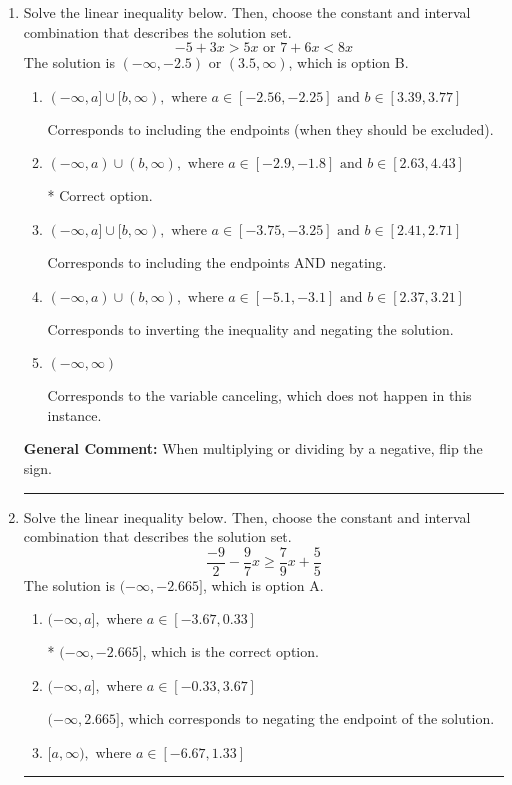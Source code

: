 \documentclass{extbook}[14pt]
\newcommand{\litem}[1]{\item #1

\rule{\textwidth}{0.4pt}}
\begin{document}
\begin{enumerate}\litem{
Solve the linear inequality below. Then, choose the constant and interval combination that describes the solution set.
\[ -5 + 3 x > 5 x \text{ or } 7 + 6 x < 8 x \]The solution is \( (-\infty, -2.5) \text{ or } (3.5, \infty) \), which is option B.\begin{enumerate}[label=\Alph*.]
\item \( (-\infty, a] \cup [b, \infty), \text{ where } a \in [-2.56, -2.25] \text{ and } b \in [3.39, 3.77] \)

Corresponds to including the endpoints (when they should be excluded).
\item \( (-\infty, a) \cup (b, \infty), \text{ where } a \in [-2.9, -1.8] \text{ and } b \in [2.63, 4.43] \)

 * Correct option.
\item \( (-\infty, a] \cup [b, \infty), \text{ where } a \in [-3.75, -3.25] \text{ and } b \in [2.41, 2.71] \)

Corresponds to including the endpoints AND negating.
\item \( (-\infty, a) \cup (b, \infty), \text{ where } a \in [-5.1, -3.1] \text{ and } b \in [2.37, 3.21] \)

Corresponds to inverting the inequality and negating the solution.
\item \( (-\infty, \infty) \)

Corresponds to the variable canceling, which does not happen in this instance.
\end{enumerate}

\textbf{General Comment:} When multiplying or dividing by a negative, flip the sign.
}
\litem{
Solve the linear inequality below. Then, choose the constant and interval combination that describes the solution set.
\[ \frac{-9}{2} - \frac{9}{7} x \geq \frac{7}{9} x + \frac{5}{5} \]The solution is \( (-\infty, -2.665] \), which is option A.\begin{enumerate}[label=\Alph*.]
\item \( (-\infty, a], \text{ where } a \in [-3.67, 0.33] \)

* $(-\infty, -2.665]$, which is the correct option.
\item \( (-\infty, a], \text{ where } a \in [-0.33, 3.67] \)

 $(-\infty, 2.665]$, which corresponds to negating the endpoint of the solution.
\item \( [a, \infty), \text{ where } a \in [-6.67, 1.33] \)


\end{enumerate}}
\end{enumerate}
\end{document}
